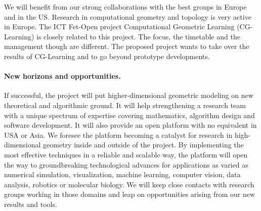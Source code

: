 We will benefit from our strong collaborations with the best groups in Europe and in the US.
Research in computational geometry and topology is very active in  Europe.  The ICT Fet-Open project Computational Geometric Learning (CG-Learning) is closely related to this project. The focus, the timetable and the management though are different. The proposed project wants to take over the results of CG-Learning and to go beyond prototype developments.  %




\paragraph{New horizons and opportunities.} 




If successful, the project will put higher-dimensional geometric modeling on new theoretical and algorithmic ground. It will help strengthening a research team with a unique spectrum of expertise covering mathematics, algorithm design and software development.
It will also provide an open platform with no equivalent in USA or Asia. We foresee the platform becoming a catalyst for research in high-dimensional geometry inside and outside of the project.  
By implementing the most effective techniques in a  reliable and scalable way, the platform will
open the way to groundbreaking technological advances for applications as varied as numerical simulation, visualization, machine  learning, computer vision, data analysis, robotics or molecular biology. We will keep close contacts with research groups working in those domains and leap on opportunities arising from our new results and tools.


